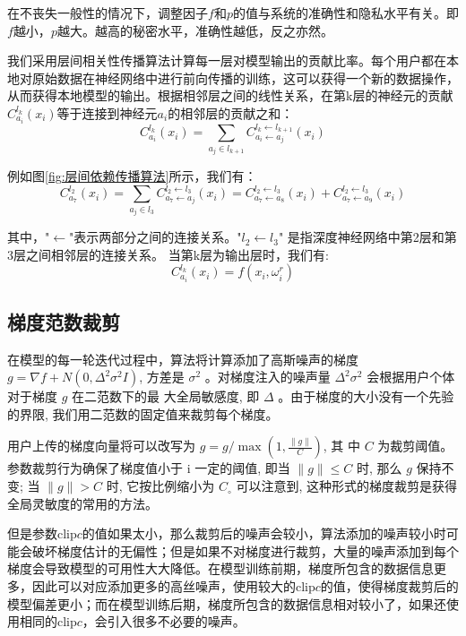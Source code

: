 在不丧失一般性的情况下，调整因子$f$和$p$的值与系统的准确性和隐私水平有关。即$f$越小，$p$越大。越高的秘密水平，准确性越低，反之亦然。

我们采用层间相关性传播算法计算每一层对模型输出的贡献比率。每个用户都在本地对原始数据在神经网络中进行前向传播的训练，这可以获得一个新的数据操作，从而获得本地模型的输出。根据相邻层之间的线性关系，在第k层的神经元的贡献$C_{a_{i}}^{l_{k}}\left(x_{i}\right)$等于连接到神经元$a_{i}$的相邻层的贡献之和：
\begin{equation}\label{eq:神经网络加噪4}
C_{a_{i}}^{l_{k}}\left(x_{i}\right)=\sum_{a_{j} \in l_{k+1}} C_{a_{i} \leftarrow a_{j}}^{l_{k} \leftarrow l_{k+1}}\left(x_{i}\right)
\end{equation}

例如图\ref{fig:层间依赖传播算法}所示，我们有：
\begin{equation}
C_{a_{7}}^{l_{2}}\left(x_{i}\right)=\sum_{a_{j} \in l_{3}} C_{a_{7} \leftarrow a_{j}}^{l_{2} \leftarrow l_{3}}\left(x_{i}\right)=C_{a_{7} \leftarrow a_{8}}^{l_{2} \leftarrow l_{3}}\left(x_{i}\right)+C_{a_{7} \leftarrow a_{9}}^{l_{2} \leftarrow l_{3}}\left(x_{i}\right)
\end{equation}

其中，"$\leftarrow$"表示两部分之间的连接关系。"$l_{2} \leftarrow l_{3}$" 是指深度神经网络中第2层和第3层之间相邻层的连接关系。
当第k层为输出层时，我们有:
\begin{equation}
C_{a_{i}}^{l_{k}}\left(x_{i}\right)=f\left(x_{i}, \omega_{i}^{r}\right)
\end{equation}

\subsection{梯度范数裁剪}
在模型的每一轮迭代过程中，算法将计算添加了高斯噪声的梯度$g=\nabla f+N\left(0, \Delta^{2} \sigma^{2} I\right)$, 方差是 $\sigma^{2}$ 。对梯度注入的噪声量 $\Delta^{2} \sigma^{2}$ 会根据用户个体对于梯度 $g$ 在二范数下的最 大全局敏感度, 即 $\Delta$ 。由于梯度的大小没有一个先验的界限, 我们用二范数的固定值来裁剪每个梯度。

用户上传的梯度向量将可以改写为 $g=g / \max \left(1, \frac{\|g\|}{C}\right)$, 其 中 $C$ 为裁剪阈值。参数裁剪行为确保了梯度值小于 $\mathrm{i}$ 一定的阈值, 即当 $\|g\| \leq C$ 时, 那么 $g$ 保持不变; 当 $\|g\|>C$ 时, 它按比例缩小为 $C_{\circ}$ 可以注意到, 这种形式的梯度裁剪是获得全局灵敏度的常用的方法。

但是参数clip$c$的值如果太小，那么裁剪后的噪声会较小，算法添加的噪声较小时可能会破坏梯度估计的无偏性；但是如果不对梯度进行裁剪，大量的噪声添加到每个梯度会导致模型的可用性大大降低。在模型训练前期，梯度所包含的数据信息更多，因此可以对应添加更多的高丝噪声，使用较大的clip$c$的值，使得梯度裁剪后的模型偏差更小；而在模型训练后期，梯度所包含的数据信息相对较小了，如果还使用相同的clip$c$，会引入很多不必要的噪声。

